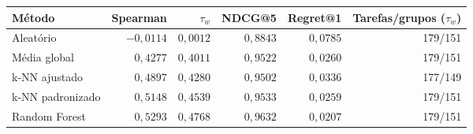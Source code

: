 \begin{tabular}{lrrrrr}
\toprule
Método & Spearman & $\tau_w$ & NDCG@5 & Regret@1 & Tarefas/grupos ($\tau_w$) \\
\midrule
Aleatório & $-0{,}0114$ & $0{,}0012$ & $0{,}8843$ & $0{,}0785$ & 179/151 \\
Média global & $0{,}4277$ & $0{,}4011$ & $0{,}9522$ & $0{,}0260$ & 179/151 \\
k-NN ajustado & $0{,}4897$ & $0{,}4280$ & $0{,}9502$ & $0{,}0336$ & 177/149 \\
k-NN padronizado & $0{,}5148$ & $0{,}4539$ & $0{,}9533$ & $0{,}0259$ & 179/151 \\
Random Forest & $0{,}5293$ & $0{,}4768$ & $0{,}9632$ & $0{,}0207$ & 179/151 \\
\bottomrule
\end{tabular}